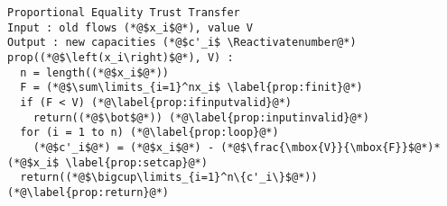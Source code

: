 \Suppressnumber
\begin{lstlisting}[label=prop, style=numbers]
Proportional Equality Trust Transfer
Input : old flows (*@$x_i$@*), value V
Output : new capacities (*@$c'_i$ \Reactivatenumber@*)
prop((*@$\left(x_i\right)$@*), V) :
  n = length((*@$x_i$@*))
  F = (*@$\sum\limits_{i=1}^nx_i$ \label{prop:finit}@*)
  if (F < V) (*@\label{prop:ifinputvalid}@*)
    return((*@$\bot$@*)) (*@\label{prop:inputinvalid}@*)
  for (i = 1 to n) (*@\label{prop:loop}@*)
    (*@$c'_i$@*) = (*@$x_i$@*) - (*@$\frac{\mbox{V}}{\mbox{F}}$@*)*(*@$x_i$ \label{prop:setcap}@*)
  return((*@$\bigcup\limits_{i=1}^n\{c'_i\}$@*)) (*@\label{prop:return}@*)
\end{lstlisting}
